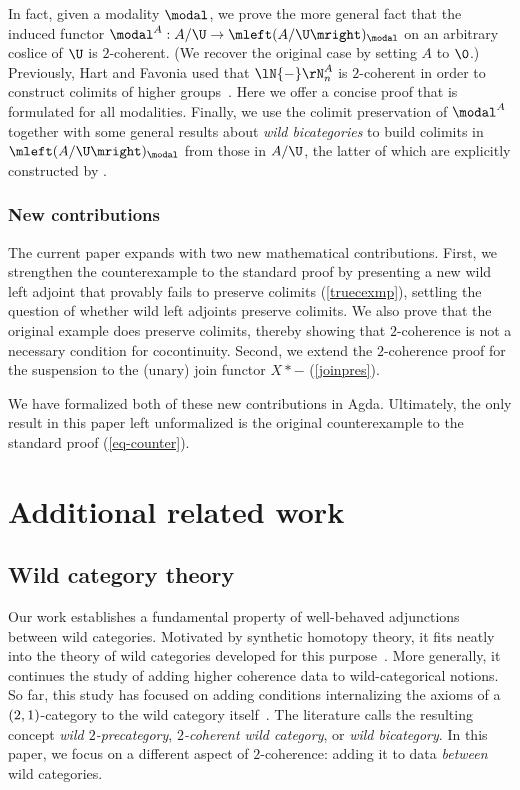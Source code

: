 In fact, given a modality $\modal$, we prove the more general fact that the induced functor $\modal^A : A/\U \to \mleft(A/\U\mright)_{\modal}$ on an arbitrary coslice of $\U$ is $2$-coherent. (We recover the original case by setting $A$ to $\0$.) Previously, Hart and Favonia used that $\lN{-}\rN_n^A$ is $2$-coherent in order to construct colimits of higher groups~\cite[Section 7]{CSL25}. Here we offer a concise proof that is formulated for all modalities. Finally, we use the colimit preservation of $\modal^A$ together with some general results about \emph{wild bicategories} to build colimits in $\mleft(A/\U\mright)_{\modal}$ from those in $A/\U$, the latter of which are explicitly constructed by \cite[Section 5]{CSL25}.

\subsubsection*{New contributions}
The current paper expands \cite{lapccsl} with two new mathematical contributions. First, we strengthen the counterexample to the standard proof by presenting a new wild left adjoint that provably fails to preserve colimits (\autoref{truecexmp}), settling the question of whether wild left adjoints preserve colimits. We also prove that the original example does preserve colimits, thereby showing that $2$-coherence is not a necessary condition for cocontinuity. Second, we extend the $2$-coherence proof for the suspension to the (unary) join functor $X \ast {-}$ (\autoref{joinpres}). 

We have formalized both of these new contributions in Agda. Ultimately, the only result in this paper left unformalized is the original counterexample to the standard proof (\autoref{eq-counter}).

\section{Additional related work}

\subsection{Wild category theory}

Our work establishes a fundamental property of well-behaved adjunctions between wild categories. Motivated by synthetic homotopy theory, it fits neatly into the theory of wild categories developed for this purpose~\cite{Hur, RK, smashmon}. More generally, it continues the study of adding higher coherence data to wild-categorical notions. So far, this study has focused on adding conditions internalizing the axioms of a $\mleft(2,1\mright)$-category to the wild category itself~\cite{chen, CK, CSL25}. The literature calls the resulting concept \emph{wild $2$-precategory}, \emph{$2$-coherent wild category}, or \emph{wild bicategory}.
In this paper, we focus on a different aspect of $2$-coherence: adding it to data \emph{between} wild categories.   
